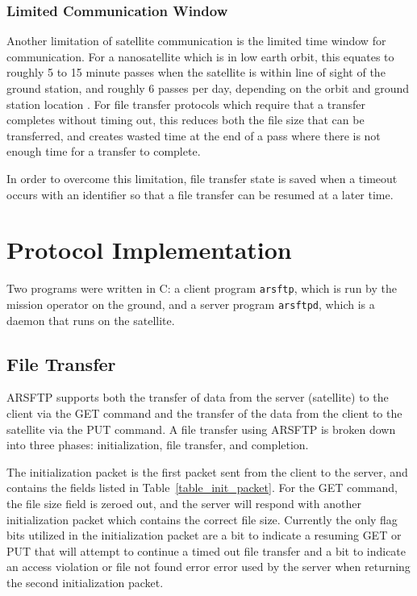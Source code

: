 \documentclass[journal]{./IEEEtran}
\begin{document}
\subsubsection{Limited Communication Window}

Another limitation of satellite communication is the limited time window for communication.  For a nanosatellite which is in low earth orbit, this equates to roughly 5 to 15 minute passes when the satellite is within line of sight of the ground station, and roughly 6 passes per day, depending on the orbit and ground station location \cite{n2yo}.  For file transfer protocols which require that a transfer completes without timing out, this reduces both the file size that can be transferred, and creates wasted time at the end of a pass where there is not enough time for a transfer to complete.

In order to overcome this limitation, file transfer state is saved when a timeout occurs with an identifier so that a file transfer can be resumed at a later time.

\section{Protocol Implementation}

Two programs were written in C: a client program {\tt arsftp}, which is run by the mission operator on the ground, and a server program {\tt arsftpd}, which is a daemon that runs on the satellite.

\subsection{File Transfer}
ARSFTP supports both the transfer of data from the server (satellite) to the client via the GET command and the transfer of the data from the client to the satellite via the PUT command.  A file transfer using ARSFTP is broken down into three phases: initialization, file transfer, and completion.

The initialization packet is the first packet sent from the client to the server, and contains the fields listed in Table~\ref{table_init_packet}.  For the GET command, the file size field is zeroed out, and the server will respond with another initialization packet which contains the correct file size.  Currently the only flag bits utilized in the initialization packet are a bit to indicate a resuming GET or PUT that will attempt to continue a timed out file transfer and a bit to indicate an access violation or file not found error error used by the server when returning the second initialization packet.  
\end{document}
